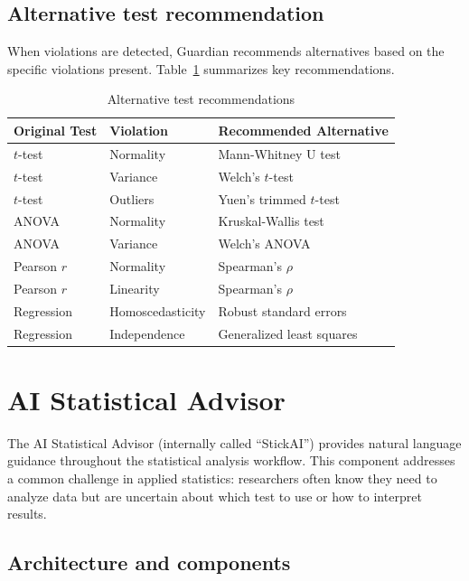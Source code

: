 \documentclass[article]{jss}
\begin{document}
\subsection{Alternative test recommendation}

When violations are detected, Guardian recommends alternatives based on the specific violations present. Table~\ref{tab:alternatives} summarizes key recommendations.

\begin{table}[htbp]
\centering
\caption{Alternative test recommendations}
\label{tab:alternatives}
\begin{tabular}{llp{6cm}}
\toprule
Original Test & Violation & Recommended Alternative \\
\midrule
$t$-test & Normality & Mann-Whitney U test \\
$t$-test & Variance & Welch's $t$-test \\
$t$-test & Outliers & Yuen's trimmed $t$-test \\
ANOVA & Normality & Kruskal-Wallis test \\
ANOVA & Variance & Welch's ANOVA \\
Pearson $r$ & Normality & Spearman's $\rho$ \\
Pearson $r$ & Linearity & Spearman's $\rho$ \\
Regression & Homoscedasticity & Robust standard errors \\
Regression & Independence & Generalized least squares \\
\bottomrule
\end{tabular}
\end{table}


\section{AI Statistical Advisor} \label{sec:advisor}

The AI Statistical Advisor (internally called ``StickAI'') provides natural language guidance throughout the statistical analysis workflow. This component addresses a common challenge in applied statistics: researchers often know they need to analyze data but are uncertain about which test to use or how to interpret results.

\subsection{Architecture and components}
\end{document}
